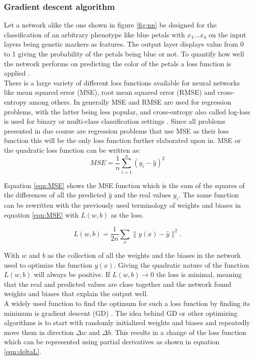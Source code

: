 \subsubsection{Gradient descent algorithm}

Let a network alike the one shown in figure \ref{fig:nn} be designed for the classification of an
arbitrary phenotype like blue petals with $x_1 \dots x_4$ on the input layers being genetic markers
as features. The output layer displays value from 0 to 1 giving the probability of the petals being
blue or not. To quantify how well the network performs on predicting the color of the petals a loss
function is applied \cite{schmidhuber2015deep}. \\
There is a large variety of different loss functions available for neural networks like mean squared
error (MSE), root mean squared error (RMSE) and cross-entropy among others. In generally MSE and
RMSE are used for regression problems, with the latter being less popular, and cross-entropy also
called log-loss is used for binary or multi-class classification settings
\cite{janocha2017loss}. Since all problems presented in due course are regression problems that use
MSE as their loss function this will be the only loss function further elaborated upon in. MSE or
the quadratic loss function can be written as:
\begin{equation}
 MSE = \frac{1}{n} \sum_{i=1}^n (y_i - \hat{y})^2
 \label{eqn:MSE}
\end{equation}

Equation \ref{eqn:MSE} shows the MSE function which is the sum of the squares of the differences of
all the predicted $\hat{y}$ and the real values $y_i$. The same function can be rewritten with the
previously used terminology of weights and biases in equation \ref{eqn:MSE} with $L(w,b)$ as the
loss.

\begin{equation}
  L(w,b) = \frac{1}{2n} \sum_x \| y(x) - \hat{y}\|^2.
 \label{eqn:MSE2}
\end{equation}


With $w$ and $b$ as the collection of all the weights and the biases in the network used to optimize
the function $y(x)$. Giving the quadratic nature of the function $L(w,b)$ will always be
positive. If $L(w,b) \rightarrow 0$ the loss is minimal, meaning that the real and predicted values
are close together and
the network found weights and biases that explain the output well. \\
A widely used function to find the optimum for such a loss function by finding its minimum is
gradient descent (GD) \cite{bottou1991stochastic}. The idea behind GD or other optimizing algorithms
is to start with randomly initialized weights and biases and repeatedly move them in direction
$\Delta w$ and $\Delta b$. This results in a change of the loss function which can be represented
using partial derivatives as shown in equation \ref{eqn:deltaL}.

